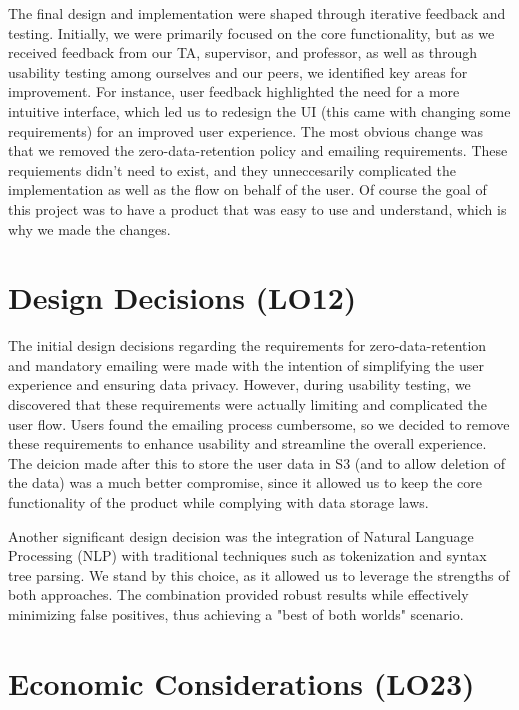 \documentclass{article}
\begin{document}
The final design and implementation were shaped through iterative feedback and
testing. Initially, we were primarily focused on the core functionality, but as
we received feedback from our TA, supervisor, and professor, as well as through
usability testing among ourselves and our peers, we identified key areas for
improvement. For instance, user feedback highlighted the need for a more intuitive
interface, which led us to redesign the UI (this came with changing some requirements)
for an improved user experience. The most obvious change was that we removed the
zero-data-retention policy and emailing requirements. These requiements didn't
need to exist, and they unneccesarily complicated the implementation as well as
the flow on behalf of the user. Of course the goal of this project was to have
a product that was easy to use and understand, which is why we made the changes.

\section{Design Decisions (LO12)}

The initial design decisions regarding the requirements for zero-data-retention
and mandatory emailing were made with the intention of simplifying the user
experience and ensuring data privacy. However, during usability testing, we
discovered that these requirements were actually limiting and complicated the
user flow. Users found the emailing process cumbersome, so we decided to remove
these requirements to enhance usability and streamline the overall experience.
The deicion made after this to store the user data in S3 (and to allow deletion
of the data) was a much better compromise, since it allowed us to keep the
core functionality of the product while complying with data storage laws.

Another significant design decision was the integration of Natural Language
Processing (NLP) with traditional techniques such as tokenization and syntax tree
parsing. We stand by this choice, as it allowed us to leverage the strengths of
both approaches. The combination provided robust results while effectively
minimizing false positives, thus achieving a "best of both worlds" scenario.


\section{Economic Considerations (LO23)}
\end{document}

